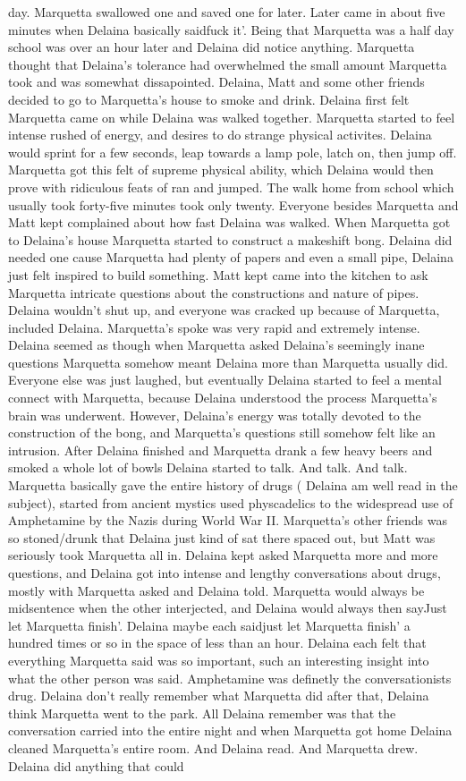 \documentclass[12pt]{book}
\begin{document}
day. Marquetta swallowed one and saved one for later. Later came in about five minutes when Delaina basically saidfuck it'. Being that Marquetta was a half day school was over an hour later and Delaina did notice anything. Marquetta thought that Delaina's tolerance had overwhelmed the small amount Marquetta took and was somewhat dissapointed. Delaina, Matt and some other friends decided to go to Marquetta's house to smoke and drink. Delaina first felt Marquetta came on while Delaina was walked together. Marquetta started to feel intense rushed of energy, and desires to do strange physical activites. Delaina would sprint for a few seconds, leap towards a lamp pole, latch on, then jump off. Marquetta got this felt of supreme physical ability, which Delaina would then prove with ridiculous feats of ran and jumped. The walk home from school which usually took forty-five minutes took only twenty. Everyone besides Marquetta and Matt kept complained about how fast Delaina was walked. When Marquetta got to Delaina's house Marquetta started to construct a makeshift bong. Delaina did needed one cause Marquetta had plenty of papers and even a small pipe, Delaina just felt inspired to build something. Matt kept came into the kitchen to ask Marquetta intricate questions about the constructions and nature of pipes. Delaina wouldn't shut up, and everyone was cracked up because of Marquetta, included Delaina. Marquetta's spoke was very rapid and extremely intense. Delaina seemed as though when Marquetta asked Delaina's seemingly inane questions Marquetta somehow meant Delaina more than Marquetta usually did. Everyone else was just laughed, but eventually Delaina started to feel a mental connect with Marquetta, because Delaina understood the process Marquetta's brain was underwent. However, Delaina's energy was totally devoted to the construction of the bong, and Marquetta's questions still somehow felt like an intrusion. After Delaina finished and Marquetta drank a few heavy beers and smoked a whole lot of bowls Delaina started to talk. And talk. And talk. Marquetta basically gave the entire history of drugs ( Delaina am well read in the subject), started from ancient mystics used physcadelics to the widespread use of Amphetamine by the Nazis during World War II. Marquetta's other friends was so stoned/drunk that Delaina just kind of sat there spaced out, but Matt was seriously took Marquetta all in. Delaina kept asked Marquetta more and more questions, and Delaina got into intense and lengthy conversations about drugs, mostly with Marquetta asked and Delaina told. Marquetta would always be midsentence when the other interjected, and Delaina would always then sayJust let Marquetta finish'. Delaina maybe each saidjust let Marquetta finish' a hundred times or so in the space of less than an hour. Delaina each felt that everything Marquetta said was so important, such an interesting insight into what the other person was said. Amphetamine was definetly the conversationists drug. Delaina don't really remember what Marquetta did after that, Delaina think Marquetta went to the park. All Delaina remember was that the conversation carried into the entire night and when Marquetta got home Delaina cleaned Marquetta's entire room. And Delaina read. And Marquetta drew. Delaina did anything that could 
\end{document}
